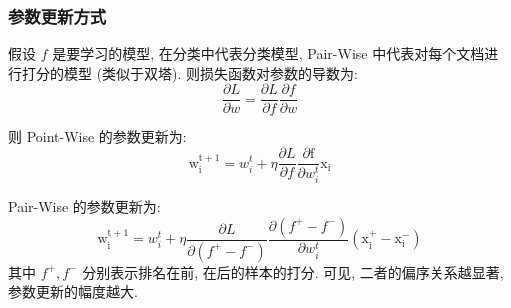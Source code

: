 \subsubsection{参数更新方式}
假设 $f$ 是要学习的模型, 在分类中代表分类模型, Pair-Wise 中代表对每个文档进行打分的模型 (类似于双塔). 则损失函数对参数的导数为:
$$
\frac{\partial L}{\partial w}=\frac{\partial L}{\partial f} \frac{\partial f}{\partial w}
$$

则 Point-Wise 的参数更新为:
$$
\mathrm{w}_{\mathrm{i}}^{\mathrm{t}+1}=w_{i}^{t}+\eta \frac{\partial L}{\partial f} \frac{\partial \mathrm{f}}{\partial w_{i}^{t}} \mathrm{x}_{\mathrm{i}}
$$

Pair-Wise 的参数更新为:
$$
\mathrm{w}_{\mathrm{i}}^{\mathrm{t}+1}=w_{i}^{t}+\eta \frac{\partial L}{\partial\left(f^{+}-f^{-}\right)} \frac{\partial\left(f^{+}-f^{-}\right)}{\partial w_{i}^{t}}\left(\mathrm{x}_{\mathrm{i}}^{+}-\mathrm{x}_{\mathrm{i}}^{-}\right)
$$
其中 $f^+, f^-$ 分别表示排名在前, 在后的样本的打分. 可见, 二者的偏序关系越显著, 参数更新的幅度越大.
